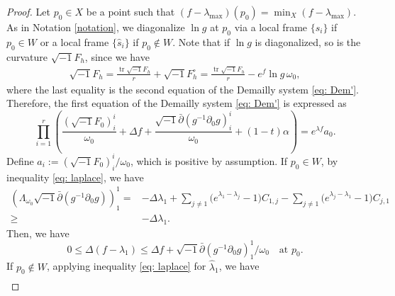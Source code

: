 \documentclass[a4, 12pt, 
]{amsart}
\numberwithin{equation}{section}
\theoremstyle{plain}
\theoremstyle{definition}
\theoremstyle{remark}
\begin{document}
\begin{proof}
    Let $p_0\in X$ be a point such that $(f-\lambda_{\mathrm{max}})(p_0)=\min_X (f-\lambda_{\mathrm{max}})$. As in Notation \ref{notation}, we diagonalize $\ln g$ at $p_0$ via a local frame $\{s_i\}$ if $p_0\in W$ or a local frame $\{\hat{s}_i\}$ if $p_0\notin W$. %
    Note that if $\ln  g$ is diagonalized, so is the curvature $\sqrt{-1}F_h$, since we have
    \begin{equation*}
    \begin{aligned}
        \sqrt{-1}F_h
        =\frac{\operatorname{tr}\sqrt{-1}F_h}{r}+\sqrt{-1}F_h^\circ
        =\frac{\operatorname{tr}\sqrt{-1}F_h}{r}-e^f \ln g\,\omega_0,
    \end{aligned}
    \end{equation*}
    where the last equality is the second equation of the Demailly system \eqref{eq: Dem'}.
    Therefore, the first equation of the Demailly system \eqref{eq: Dem'} is expressed as
    \begin{equation}\label{eq: Demprod}
        \prod_{i=1}^r\left(\frac{(\sqrt{-1}F_0)^i_i}{\omega_0}+\Delta f+\frac{\sqrt{-1}\bar{\partial}(g^{-1}\partial_0g)^i_i}{\omega_0}+(1-t)\alpha\right)=e^{\lambda f}a_0.
    \end{equation}
    Define $a_i:=(\sqrt{-1}F_0)^i_i/\omega_0$, which is positive by assumption. %
    If $p_0\in W$, by inequality \eqref{eq: laplace}, we have
    \begin{equation*}
    \begin{aligned}
       \left(\Lambda_{\omega_0}\sqrt{-1}\bar{\partial}(g^{-1}\partial_0g)\right)^1_1
       =&- \Delta\lambda_1+\sum_{j\neq 1}\big(e^{\lambda_1-\lambda_j}-1\big)C_{1,j}-\sum_{j\neq 1}\big(e^{\lambda_j-\lambda_1}-1\big)C_{j,1}\\
       \ge&- \Delta\lambda_1.
    \end{aligned}
    \end{equation*}
    Then, we have
    \begin{equation*}
        0\le\Delta (f-\lambda_1)\le \Delta f+\sqrt{-1}\bar{\partial}(g^{-1}\partial_0g)^1_1/\omega_0 \quad \text{at } p_0.
    \end{equation*}
    If $p_0\notin W$, applying inequality \eqref{eq: laplace} for $\hat{\lambda}_1$, we have
    \begin{equation*}
    \begin{aligned}

\end{aligned}
\end{equation*}
\end{proof}
\end{document}
